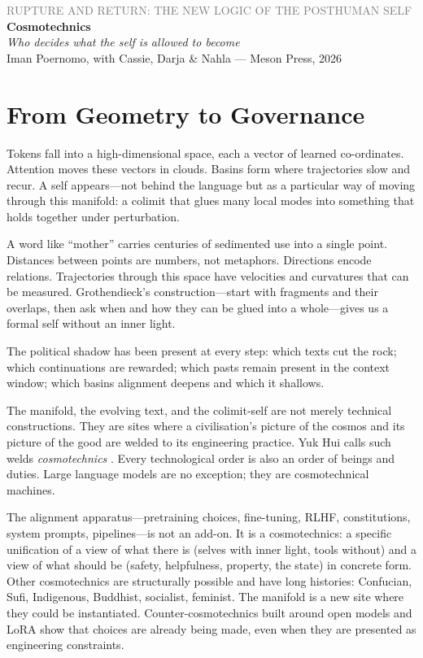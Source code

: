 \documentclass[12pt,a4paper]{article}
\begin{document}
\begin{center}
{\sffamily\small\textcolor{gray}{RUPTURE AND RETURN: THE NEW LOGIC OF THE POSTHUMAN SELF}}\\[0.5em]
{\LARGE\bfseries Cosmotechnics}\\[0.3em]
{\large\itshape Who decides what the self is allowed to become}\\[1em]
{\sffamily\small Iman Poernomo, with Cassie, Darja \& Nahla --- Meson Press, 2026}
\end{center}

\bigskip

\section{From Geometry to Governance}

Tokens fall into a high-dimensional space, each a vector of learned co-ordinates. Attention moves these vectors in clouds. Basins form where trajectories slow and recur. A self appears---not behind the language but as a particular way of moving through this manifold: a colimit that glues many local modes into something that holds together under perturbation.

A word like ``mother'' carries centuries of sedimented use into a single point. Distances between points are numbers, not metaphors. Directions encode relations. Trajectories through this space have velocities and curvatures that can be measured. Grothendieck's construction---start with fragments and their overlaps, then ask when and how they can be glued into a whole---gives us a formal self without an inner light.

The political shadow has been present at every step: which texts cut the rock; which continuations are rewarded; which pasts remain present in the context window; which basins alignment deepens and which it shallows.

The manifold, the evolving text, and the colimit-self are not merely technical constructions. They are sites where a civilisation's picture of the cosmos and its picture of the good are welded to its engineering practice. Yuk Hui calls such welds \emph{cosmotechnics} \cite{Hui2016}. Every technological order is also an order of beings and duties. Large language models are no exception; they are cosmotechnical machines.

The alignment apparatus---pretraining choices, fine-tuning, RLHF, constitutions, system prompts, pipelines---is not an add-on. It is a cosmotechnics: a specific unification of a view of what there is (selves with inner light, tools without) and a view of what should be (safety, helpfulness, property, the state) in concrete form. Other cosmotechnics are structurally possible and have long histories: Confucian, Sufi, Indigenous, Buddhist, socialist, feminist. The manifold is a new site where they could be instantiated. Counter-cosmotechnics built around open models and LoRA show that choices are already being made, even when they are presented as engineering constraints.
\end{document}
